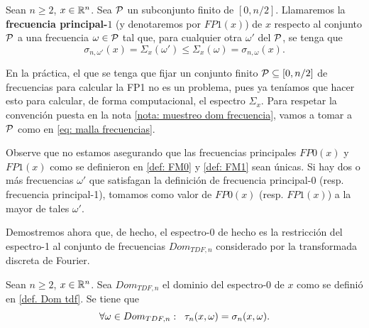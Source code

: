 \begin{defi}
	\label{def: FM1}
	Sean $n \geq 2$, $x \in \mathbb{R}^{n}$. Sea
	$\mathcal{P}$ un subconjunto finito
	de $[0, n/2]$.
	Llamaremos la \textbf{frecuencia principal-$1$}
	(y denotaremos
	por $FP1(x)$) 
	de $x$ respecto al conjunto $\mathcal{P}$	
	a una frecuencia $\omega \in \mathcal{P}$ 
	tal que, para cualquier otra $\omega'$ del $\mathcal{P}$, se tenga que
	\[
	\sigma_{n, \omega'}(x) = \Sigma_{x}(\omega') 
	\leq \Sigma_{x}(\omega) = \sigma_{n, \omega}(x).
	\]
\end{defi}
En la práctica, el que se tenga que fijar un conjunto
finito $\mathcal{P} \subseteq [0, n/2]$ de frecuencias
para calcular la FP1 no es un problema, pues ya teníamos que hacer
esto para calcular, de forma computacional, el espectro
$\Sigma_{x}$. Para respetar la convención
puesta en la nota 
\ref{nota: muestreo dom frecuencia}, vamos
a tomar a $\mathcal{P}$ como en 
\eqref{eq: malla frecuencias}.
	
\begin{nota}
Observe que no estamos asegurando
que las frecuencias principales
$FP0(x)$ y $FP1(x)$ como se definieron en 
\ref{def: FM0} y \ref{def: FM1}
sean únicas.
Si hay dos o más frecuencias $\omega'$ que satisfagan
la definición de frecuencia principal-0 
(resp. frecuencia principal-1), tomamos
como valor de $FP0(x)$ 
(resp. $FP1(x)$)
a la mayor de tales $\omega'$.
\end{nota}


Demostremos ahora que, de hecho, el espectro-0
de hecho es la restricción del espectro-1
al conjunto de frecuencias 
$Dom_{TDF, n}$ considerado por la transformada discreta
de Fourier.
\begin{prop}
\label{prop: coinciden espectr}
Sean $n \geq 2$, $x \in \mathbb{R}^{n}$.
Sea $Dom_{TDF, n}$ el dominio del espectro-0 de $x$
como se definió en \ref{def. Dom tdf}. Se tiene que
\begin{equation}
\label{eq4: 4May}
\forall \omega \in Dom_{TDF, n}:
\hspace{0.2cm} \tau_{n}(x, \omega) = \sigma_{n}(x, \omega).
\end{equation}
\end{prop}

